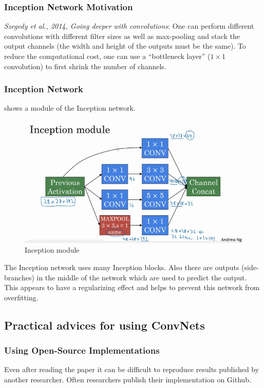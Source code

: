 \documentclass{article}
\begin{document}
\subsubsection{Inception Network Motivation}
\emph{Szegedy et al., 2014, Going deeper with convolutions}:
One can perform different convolutions with different filter sizes as well as max-pooling and stack the output channels
(the width and height of the outputs must be the same).
To reduce the computational cost, one can use a ``bottleneck layer'' ($1\times 1$ convolution) to first shrink the number of channels.

\subsubsection{Inception Network}
 shows a module of the Inception network.
\begin{figure}
  \begin{center}
    \includegraphics[width=\textwidth]{inception}
    \caption{Inception module}
    \label{fig:inception}
  \end{center}
\end{figure}
The Inception network uses many Inception blocks.
Also there are outputs (side-branches) in the middle of the network which are used to predict the output.
This appears to have a regularizing effect and helps to prevent this network from overfitting.

\subsection{Practical advices for using ConvNets}
\subsubsection{Using Open-Source Implementations}
Even after reading the paper it can be difficult to reproduce results published by another researcher.
Often researchers publish their implementation on Github.
\end{document}
